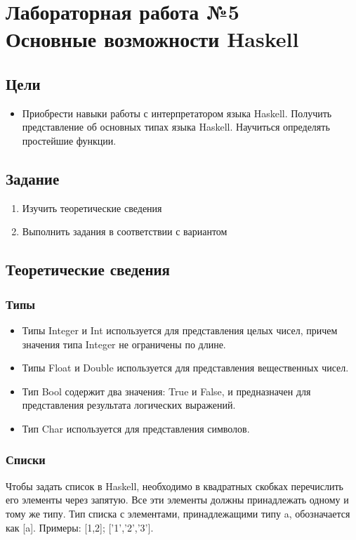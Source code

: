 \documentclass[a4paper,12pt]{article}
\begin{document}
\newpage
\section{Лабораторная работа №5 \\
	Основные возможности Haskell}
\subsection{Цели}
\begin{itemize}
	\item Приобрести навыки работы с интерпретатором языка Haskell. Получить представление об основных типах языка Haskell. Научиться определять простейшие функции.
\end{itemize}

\subsection{Задание}
\begin{enumerate}
	\item Изучить теоретические сведения
	\item Выполнить задания в соответствии с вариантом
\end{enumerate}

\subsection{Теоретические сведения}
\subsubsection{Типы}
\begin{itemize}
	\item Типы Integer и Int используется для представления целых чисел, причем значения типа Integer не ограничены по длине.
	\item Типы Float и Double используется для представления вещественных чисел.
	\item Тип Bool содержит два значения: True и False, и предназначен для представления результата логических выражений.
	\item  Тип Char используется для представления символов.
\end{itemize}

\subsubsection{Списки}
Чтобы задать список в Haskell, необходимо в квадратных скобках перечислить его элементы через запятую. Все эти элементы должны принадлежать одному и тому же типу. Тип списка с элементами, принадлежащими типу a, обозначается как [a]. Примеры: [1,2]; ['1','2','3'].
\end{document}
